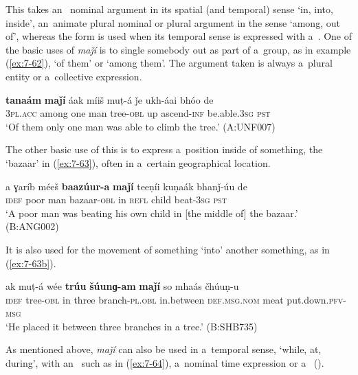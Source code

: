  This  takes an~ nominal argument in its spatial (and temporal) sense `in, into, inside', an~animate  plural nominal or  plural argument in the sense `among, out of', whereas the  form is used when its temporal sense is expressed with a~. One of the basic uses of \textit{maǰí} is to single somebody out as part of a~group, as in example (\ref{ex:7-62}), `of them' or `among them'. The argument taken is always a~plural entity or a~collective expression.

\begin{exe}
\ex
\label{ex:7-62}
\gll \textbf{tanaám} \textbf{maǰí} áak míiš muṭ-á ǰe ukh-áai bhóo de \\
\textsc{3pl.acc} among one man tree-\textsc{obl} up ascend-\textsc{inf}  be.able.\textsc{3sg} \textsc{pst} \\
\glt `Of them only one man was able to climb the tree.' (A:UNF007)
\end{exe}

The other basic use of this  is to express a~position inside of something, the `bazaar' in (\ref{ex:7-63}), often in a~certain geographical location.

\begin{exe}
\ex
\label{ex:7-63}
\gll a ɣaríb méeš \textbf{baazúur-a} \textbf{maǰí} teeṇíi kuṇaák bhanǰ-úu de \\
\textsc{idef} poor man bazaar-\textsc{obl} in \textsc{refl} child beat-\textsc{3sg} \textsc{pst} \\
\glt `A poor man was beating his own child in [the middle of] the bazaar.' (B:ANG002)
\end{exe}

It is also used for the movement of something `into' another something, as in (\ref{ex:7-63b}).

\begin{exe}
\ex
\label{ex:7-63b}
\gll ak muṭ-á wée \textbf{trúu} \textbf{šúunɡ-am} \textbf{maǰí} so mhaás čhúuṇ-u \\
\textsc{idef} tree-\textsc{obl} in three branch-\textsc{pl.obl} in.between \textsc{def.msg.nom} meat put.down.\textsc{pfv-msg} \\
\glt `He placed it between three branches in a tree.' (B:SHB735)
\end{exe}

As mentioned above, \textit{maǰí} can also be used in a~temporal sense, `while, at, during', with an~  such as in (\ref{ex:7-64}), a~nominal time expression or a~ ().

